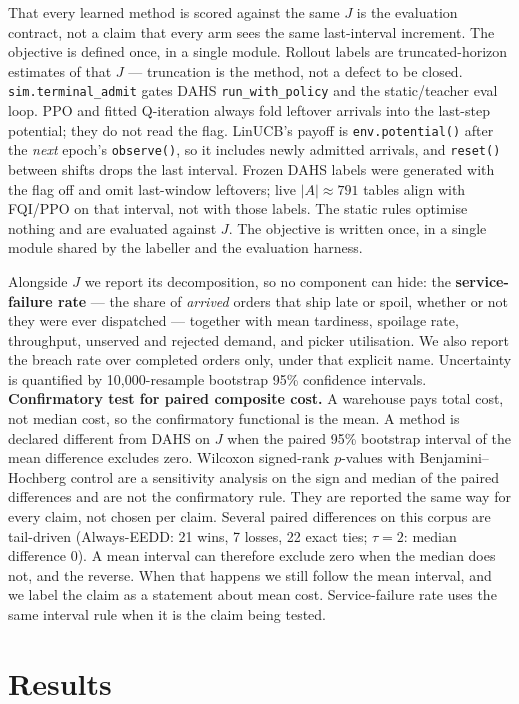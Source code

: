 \documentclass[review,3p,times]{elsarticle}
\theoremstyle{definition}
\begin{document}
That every learned method is scored against the same \(J\) is the
evaluation contract, not a claim that every arm sees the same
last-interval increment. The objective is defined once, in a single
module. Rollout labels are truncated-horizon estimates of that \(J\) ---
truncation is the method, not a defect to be closed.
\texttt{sim.terminal\_admit} gates DAHS \texttt{run\_with\_policy} and
the static/teacher eval loop. PPO and fitted Q-iteration always fold
leftover arrivals into the last-step potential; they do not read the
flag. LinUCB's payoff is \texttt{env.potential()} after the \emph{next}
epoch's \texttt{observe()}, so it includes newly admitted arrivals, and
\texttt{reset()} between shifts drops the last interval. Frozen DAHS
labels were generated with the flag off and omit last-window leftovers;
live \(|A|\approx 791\) tables align with FQI/PPO on that interval, not
with those labels. The static rules optimise nothing and are evaluated
against \(J\). The objective is written once, in a single module shared
by the labeller and the evaluation harness.

Alongside \(J\) we report its decomposition, so no component can hide:
the \textbf{service-failure rate} --- the share of \emph{arrived} orders
that ship late or spoil, whether or not they were ever dispatched ---
together with mean tardiness, spoilage rate, throughput, unserved and
rejected demand, and picker utilisation. We also report the breach rate
over completed orders only, under that explicit name. Uncertainty is
quantified by 10,000-resample bootstrap 95\% confidence intervals.
\textbf{Confirmatory test for paired composite cost.} A warehouse pays
total cost, not median cost, so the confirmatory functional is the mean.
A method is declared different from DAHS on \(J\) when the paired 95\%
bootstrap interval of the mean difference excludes zero. Wilcoxon
signed-rank \(p\)-values with Benjamini--Hochberg control are a
sensitivity analysis on the sign and median of the paired differences
and are not the confirmatory rule. They are reported the same way for
every claim, not chosen per claim. Several paired differences on this
corpus are tail-driven (Always-EEDD: 21 wins, 7 losses, 22 exact ties;
\(\tau=2\): median difference 0). A mean interval can therefore exclude
zero when the median does not, and the reverse. When that happens we
still follow the mean interval, and we label the claim as a statement
about mean cost. Service-failure rate uses the same interval rule when
it is the claim being tested.

\section{Results}\label{results}
\end{document}

